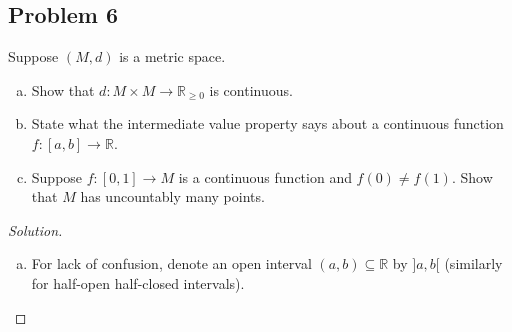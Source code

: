 \documentclass[12pt]{article}
\newcommand{\real}{\mathbb{R}}
\theoremstyle{definition}
\begin{document}
\subsection{Problem 6 \texorpdfstring{\cite{stm}}{}}
Suppose $(M,d)$ is a metric space.
\begin{enumerate}[a)]
    \item Show that $d : M \times M \to \real_{\geq 0}$ is continuous. 
    \item State what the intermediate value property says about a continuous function $f : [a,b] \to \real$.
    \item Suppose $f : [0,1] \to M$ is a continuous function and $f(0) \neq f(1)$. Show that $M$ has uncountably many points.
\end{enumerate}
\begin{proof}[Solution]
    \noindent
    \begin{enumerate}[a)]
        \item For lack of confusion, denote an open interval $(a,b) \subseteq \real$ by $]a,b[$ (similarly for half-open half-closed intervals). 
        

\end{enumerate}
\end{proof}
\end{document}
